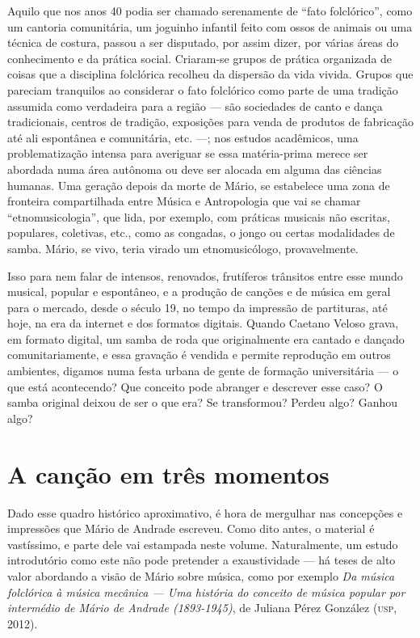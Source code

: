 Aquilo que nos anos 40 podia ser chamado serenamente de ``fato
folclórico'', como um cantoria comunitária, um joguinho infantil feito
com ossos de animais ou uma técnica de costura, passou a ser disputado,
por assim dizer, por várias áreas do conhecimento e da prática social.
Criaram-se grupos de prática organizada de coisas que a disciplina
folclórica recolheu da dispersão da vida vivida. Grupos que pareciam
tranquilos ao considerar o fato folclórico como parte de uma tradição
assumida como verdadeira para a região --- são sociedades de canto e
dança tradicionais, centros de tradição, exposições para venda de
produtos de fabricação até ali espontânea e comunitária, etc. ---; nos
estudos acadêmicos, uma problematização intensa para averiguar se essa
matéria-prima merece ser abordada numa área autônoma ou deve ser alocada
em alguma das ciências humanas. Uma geração depois da morte de Mário, se
estabelece uma zona de fronteira compartilhada entre Música e
Antropologia que vai se chamar ``etnomusicologia'', que lida, por
exemplo, com práticas musicais não escritas, populares, coletivas, etc.,
como as congadas, o jongo ou certas modalidades de samba. Mário, se
vivo, teria virado um etnomusicólogo, provavelmente.

Isso para nem falar de intensos, renovados, frutíferos trânsitos entre
esse mundo musical, popular e espontâneo, e a produção de canções e de
música em geral para o mercado, desde o século 19, no tempo da impressão
de partituras, até hoje, na era da internet e dos formatos digitais.
Quando Caetano Veloso grava, em formato digital, um samba de roda que
originalmente era cantado e dançado comunitariamente, e essa gravação é
vendida e permite reprodução em outros ambientes, digamos numa festa
urbana de gente de formação universitária --- o que está acontecendo? Que
conceito pode abranger e descrever esse caso? O samba original deixou de
ser o que era? Se transformou? Perdeu algo? Ganhou algo?

\section{A canção em três momentos}

Dado esse quadro histórico aproximativo, é hora de mergulhar nas
concepções e impressões que Mário de Andrade escreveu. Como dito antes,
o material é vastíssimo, e parte dele vai estampada neste volume.
Naturalmente, um estudo introdutório como este não pode pretender a
exaustividade --- há teses de alto valor abordando a visão de Mário sobre
música, como por exemplo \emph{Da música folclórica à música mecânica ---
Uma história do conceito de música popular por intermédio de Mário de
Andrade (1893-1945)}, de Juliana Pérez González (\textsc{usp}, 2012).

